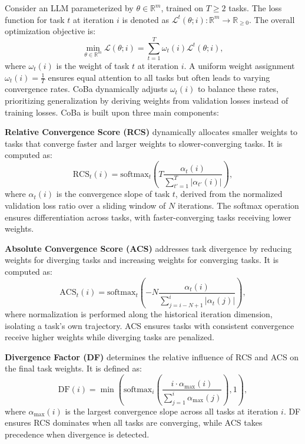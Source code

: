 Consider an LLM parameterized by $\theta \in \mathbb{R}^m$, trained on $T \geq 2$ tasks. The loss function for task $t$ at iteration $i$ is denoted as $\mathcal{L}^t(\theta; i): \mathbb{R}^m \to \mathbb{R}_{\geq 0}$. The overall optimization objective is:
\begin{equation}
\min_{\theta \in \mathbb{R}^m} \mathcal{L}(\theta; i) = \sum_{t=1}^T \omega_t(i) \mathcal{L}^t(\theta; i),
\end{equation}
where $\omega_t(i)$ is the weight of task $t$ at iteration $i$. A uniform weight assignment $\omega_t(i) = \frac{1}{T}$ ensures equal attention to all tasks but often leads to varying convergence rates. CoBa dynamically adjusts $\omega_t(i)$ to balance these rates, prioritizing generalization by deriving weights from validation losses instead of training losses.
CoBa is built upon three main components:

\textbf{Relative Convergence Score (RCS)} dynamically allocates smaller weights to tasks that converge faster and larger weights to slower-converging tasks. It is computed as:
\begin{equation}
\label{eq:rcs}
\text{RCS}_t(i) = \text{softmax}_t \left( T \frac{\alpha_t(i)}{\sum_{t'=1}^T |\alpha_{t'}(i)|} \right),
\end{equation}
where $\alpha_t(i)$ is the convergence slope of task $t$, derived from the normalized validation loss ratio over a sliding window of $N$ iterations. The softmax operation ensures differentiation across tasks, with faster-converging tasks receiving lower weights.

\textbf{Absolute Convergence Score (ACS)} addresses task divergence by reducing weights for diverging tasks and increasing weights for converging tasks. It is computed as:
\begin{equation}
\label{eq:acs}
\text{ACS}_t(i) = \text{softmax}_t \left( -N \frac{\alpha_t(i)}{\sum_{j=i-N+1}^i |\alpha_t(j)|} \right),
\end{equation}
where normalization is performed along the historical iteration dimension, isolating a task's own trajectory. ACS ensures tasks with consistent convergence receive higher weights while diverging tasks are penalized.

\textbf{Divergence Factor (DF)} determines the relative influence of RCS and ACS on the final task weights. It is defined as:
\begin{equation}
\label{eq:df}
\text{DF}(i) = \min \left( \text{softmax}_i \left( \frac{i \cdot \alpha_{\text{max}}(i)}{\sum_{j=1}^i \alpha_{\text{max}}(j)} \right), 1 \right),
\end{equation}
where $\alpha_{\text{max}}(i)$ is the largest convergence slope across all tasks at iteration $i$. DF ensures RCS dominates when all tasks are converging, while ACS takes precedence when divergence is detected.

